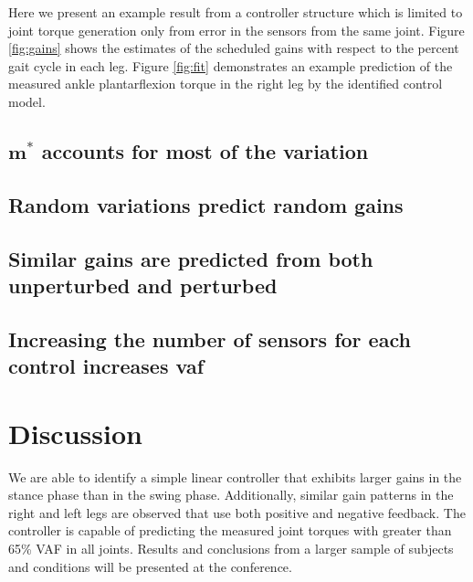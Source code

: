 \documentclass{article}
\begin{document}
Here we present an example result from a controller structure which is limited
to joint torque generation only from error in the sensors from the same joint.
Figure \ref{fig:gains} shows the estimates of the scheduled gains with respect
to the percent gait cycle in each leg. Figure \ref{fig:fit} demonstrates an
example prediction of the measured ankle plantarflexion torque in the right leg
by the identified control model.
%
%
\subsection*{$\mathbf{m}^*$ accounts for most of the variation}
%
\subsection*{Random variations predict random gains}
%
\subsection*{Similar gains are predicted from both unperturbed and perturbed}
%
\subsection*{Increasing the number of sensors for each control increases vaf}
\section*{Discussion}
%
We are able to identify a simple linear controller that exhibits larger gains
in the stance phase than in the swing phase. Additionally, similar gain
patterns in the right and left legs are observed that use both positive and
negative feedback. The controller is capable of predicting the measured joint
torques with greater than 65\% VAF in all joints. Results and conclusions from
a larger sample of subjects and conditions will be presented at the conference.

%
\end{document}
